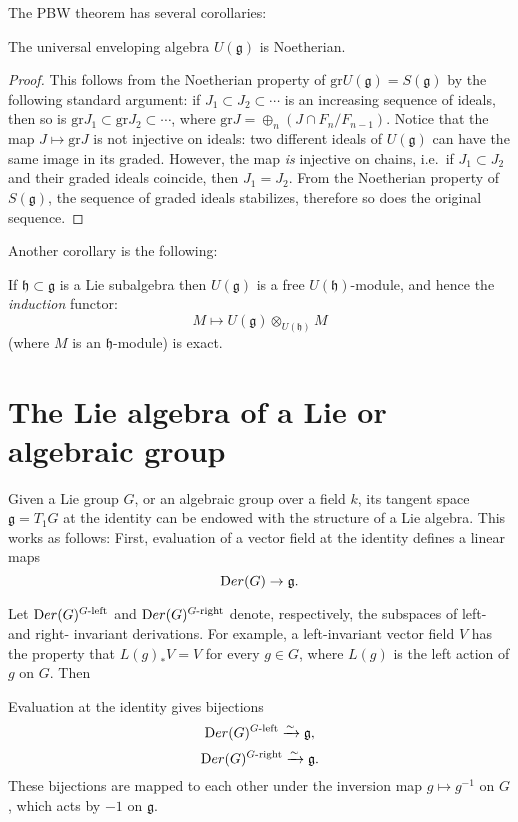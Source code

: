 The PBW theorem has several corollaries:

\begin{proposition}
\label{proposition-Ug-Noetherian}
The universal enveloping algebra $U(\mathfrak g)$ is Noetherian.
\end{proposition}

\begin{proof}
This follows from the Noetherian property of $\text{gr} U(\mathfrak g) = S(\mathfrak g)$ by the following standard argument: if $J_1\subset J_2 \subset \cdots $ is an increasing sequence of ideals, then so is $\text{gr} J_1\subset \text{gr} J_2 \subset \cdots$, where $\text{gr} J = \oplus_n (J\cap F_n/F_{n-1})$. Notice that the map $J\mapsto \text{gr} J$ is not injective on ideals: two different ideals of $U(\mathfrak g)$ can have the same image in its graded. However, the map \emph{is} injective on chains, i.e.\ if $J_1\subset J_2$ and their graded ideals coincide, then $J_1=J_2$. From the Noetherian property of $S(\mathfrak g)$, the sequence of graded ideals stabilizes, therefore so does the original sequence.
\end{proof}

Another corollary is the following:

\begin{proposition}
\label{proposition-induction-exact}
 If $\mathfrak h\subset\mathfrak g$ is a Lie subalgebra then $U(\mathfrak g)$ is a free $U(\mathfrak h)$-module, and hence the \emph{induction} functor:
$$ M\mapsto U(\mathfrak g)\otimes_{U(\mathfrak h)} M$$
(where $M$ is an $\mathfrak h$-module) is exact. 
\end{proposition}




\section{The Lie algebra of a Lie or algebraic group}
\label{section-Liealgebra-ofgroup}



Given a Lie group $G$, or an algebraic group over a field $k$, its tangent space $\mathfrak g = T_1 G$ at the identity can be endowed with the structure of a Lie algebra. This works as follows: First, evaluation of a vector field at the identity defines a linear maps
$$ {\text Der}(G) \to \mathfrak g.$$

Let ${\text Der}(G)^{G\text{-left}}$ and ${\text Der}(G)^{G\text{-right}}$ denote, respectively, the subspaces of left- and right- invariant derivations. For example, a left-invariant vector field $V$ has the property that $L(g)_* V = V$ for every $g\in G$, where $L(g)$ is the left action of $g$ on $G$. Then
\begin{lemma}
 \label{lemma-evaluation-identity}
 Evaluation at the identity gives bijections
 $$ {\text Der}(G)^{G\text{-left}} \xrightarrow\sim \mathfrak g,$$ 
 $${\text Der}(G)^{G\text{-right}} \xrightarrow\sim\mathfrak g.$$
These bijections are mapped to each other under the inversion map $g\mapsto g^{-1}$ on $G$, which acts by $-1$ on $\mathfrak g$.
\end{lemma}

